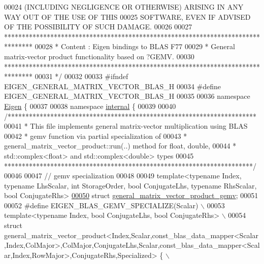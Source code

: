 \begin{DoxyCode}
00024 \textcolor{comment}{ (INCLUDING NEGLIGENCE OR OTHERWISE) ARISING IN ANY WAY OUT OF THE USE OF THIS}
00025 \textcolor{comment}{ SOFTWARE, EVEN IF ADVISED OF THE POSSIBILITY OF SUCH DAMAGE.}
00026 \textcolor{comment}{}
00027 \textcolor{comment}{ ********************************************************************************}
00028 \textcolor{comment}{ *   Content : Eigen bindings to BLAS F77}
00029 \textcolor{comment}{ *   General matrix-vector product functionality based on ?GEMV.}
00030 \textcolor{comment}{ ********************************************************************************}
00031 \textcolor{comment}{*/}
00032 
00033 \textcolor{preprocessor}{#ifndef EIGEN\_GENERAL\_MATRIX\_VECTOR\_BLAS\_H}
00034 \textcolor{preprocessor}{#define EIGEN\_GENERAL\_MATRIX\_VECTOR\_BLAS\_H}
00035 
00036 \textcolor{keyword}{namespace }\hyperlink{namespace_eigen}{Eigen} \{ 
00037 
00038 \textcolor{keyword}{namespace }\hyperlink{namespaceinternal}{internal} \{
00039 
00040 \textcolor{comment}{/**********************************************************************}
00041 \textcolor{comment}{* This file implements general matrix-vector multiplication using BLAS}
00042 \textcolor{comment}{* gemv function via partial specialization of}
00043 \textcolor{comment}{* general\_matrix\_vector\_product::run(..) method for float, double,}
00044 \textcolor{comment}{* std::complex<float> and std::complex<double> types}
00045 \textcolor{comment}{**********************************************************************/}
00046 
00047 \textcolor{comment}{// gemv specialization}
00048 
00049 \textcolor{keyword}{template}<\textcolor{keyword}{typename} Index, \textcolor{keyword}{typename} LhsScalar, \textcolor{keywordtype}{int} StorageOrder, \textcolor{keywordtype}{bool} ConjugateLhs, \textcolor{keyword}{typename} RhsScalar, \textcolor{keywordtype}{bool} 
      ConjugateRhs>
\hyperlink{struct_eigen_1_1internal_1_1general__matrix__vector__product__gemv}{00050} \textcolor{keyword}{struct }\hyperlink{struct_eigen_1_1internal_1_1general__matrix__vector__product__gemv}{general\_matrix\_vector\_product\_gemv};
00051 
00052 \textcolor{preprocessor}{#define EIGEN\_BLAS\_GEMV\_SPECIALIZE(Scalar) \(\backslash\)}
00053 \textcolor{preprocessor}{template<typename Index, bool ConjugateLhs, bool ConjugateRhs> \(\backslash\)}
00054 \textcolor{preprocessor}{struct
       general\_matrix\_vector\_product<Index,Scalar,const\_blas\_data\_mapper<Scalar,Index,ColMajor>,ColMajor,ConjugateLhs,Scalar,const\_blas\_data\_mapper<Scalar,Index,RowMajor>,ConjugateRhs,Specialized> \{ \(\backslash\)}

\end{DoxyCode}
